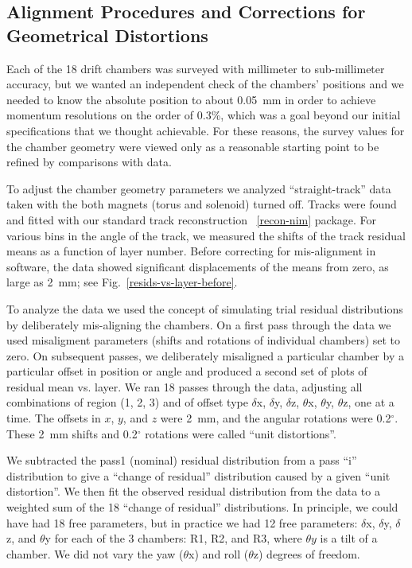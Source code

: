 \subsection{Alignment Procedures and Corrections for Geometrical Distortions}
\label{align}

Each of the 18 drift chambers was surveyed with millimeter to sub-millimeter
accuracy, but we wanted an independent check of the chambers' positions and 
we needed to know the absolute position to about 0.05~mm in order to 
achieve momentum resolutions on the order of 0.3\%, which was a goal beyond
our initial specifications that we thought achievable.  For 
these reasons, the survey values for the chamber geometry were viewed only as 
a reasonable starting point to be refined by comparisons with data.

To adjust the chamber geometry parameters we analyzed
``straight-track'' data taken with the both magnets (torus and solenoid) turned off.  
Tracks were found and fitted with our standard track reconstruction ~\ref{recon-nim} package.
For various bins in the angle of the track, we measured the shifts of the
track residual means as a function of layer number. 
Before correcting for mis-alignment in software, the data showed significant 
displacements of the means from zero, as large as 2~mm; see Fig.~\ref{resids-vs-layer-before}.

To analyze the data we used the concept of simulating trial residual
distributions by deliberately mis-aligning the chambers.
On a first pass through
the data we used misaligment parameters (shifts and rotations of individual
chambers) set to zero.  On subsequent passes, we deliberately misaligned
a particular chamber by a particular offset in position or angle and 
produced a second set of plots of residual mean vs. layer.  We ran 18 passes
through the data, adjusting all combinations of region (1, 2, 3) and
of offset type $\delta$x, $\delta$y, $\delta$z, $\theta$x, 
$\theta$y, $\theta$z, one at
a time.  The offsets in $x$, $y$, and $z$ were 2~mm, and the angular rotations
were 0.2$^\circ$.  These 2~mm shifts and 0.2$^\circ$ rotations were
called ``unit distortions''.

We subtracted the pass1 (nominal) residual distribution from a pass ``i'' distribution
to give a ``change of residual'' distribution caused by a given ``unit distortion''.
We then fit the observed residual distribution from the data to a weighted
sum of the 18 ``change of residual'' distributions.  In principle, we
could have had 18 free parameters, but in practice we had 12 free parameters:
 $\delta$x, $\delta$y, $\delta$z, and $\theta$y for each of the 3 chambers: R1, R2, and R3,
where $\theta y$ is a tilt of a chamber.  We did not vary the yaw ($\theta$x) and 
roll ($\theta$z) degrees of freedom.

